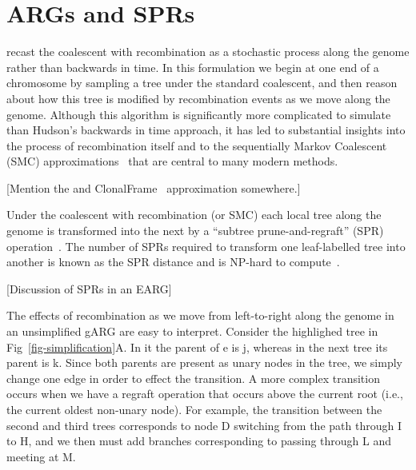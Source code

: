 \documentclass{article}
\begin{document}
\section*{ARGs and SPRs}
\citet{wiuf1999ancestry,wiuf1999recombination} recast
the coalescent with recombination
as a stochastic process along the genome rather than backwards in time.
In this formulation we begin at one end of a chromosome by
sampling a tree under the standard coalescent, and then reason
about how this tree is modified by recombination events
as we move along the genome. Although this algorithm is
significantly more complicated to simulate than Hudson's
backwards in time approach, it has led to substantial
insights into the process of recombination itself
and to the sequentially Markov Coalescent (SMC)
approximations~\citep{mcvean2005approximating,marjoram2006fast}
that are central to many modern methods.

[Mention the
and ClonalFrame~\citep{didelot2007inference} approximation somewhere.]

Under the coalescent with recombination (or SMC) each local
tree along the genome is transformed into the next by
a ``subtree prune-and-regraft'' (SPR)
operation~\citep{hein1990reconstructing,song2003on,song2006properties}.
The number of SPRs required to transform one leaf-labelled tree
into another is known as the SPR distance
and is NP-hard to
compute~\citep{hein1996complexity,allen2001subtree,bordewich2005computational}.

[Discussion of SPRs in an EARG]

The effects of recombination as we move from left-to-right along
the genome in an unsimplified gARG are easy to interpret.
Consider the highlighed tree in Fig~\ref{fig-simplification}A.
In it the parent of \textsf{e} is \textsf{j}, whereas in the next tree
its parent is \textsf{k}. Since both parents are present as
unary nodes in the tree, we simply change one edge in
order to effect the transition.
A more complex transition occurs when we have a regraft operation
that occurs above the current root (i.e., the current oldest
non-unary node). For example, the transition between the
second and third trees corresponds to node D switching
from the path through I to H, and we then must add branches
corresponding to passing through L and meeting at M.
\end{document}
